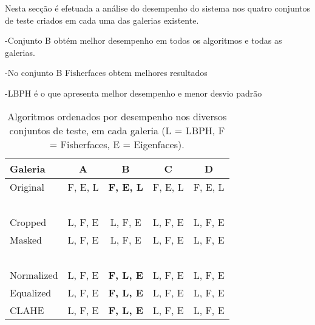Nesta secção é efetuada a análise do desempenho do sistema nos quatro conjuntos de teste criados em cada uma das galerias existente.

-Conjunto B obtém melhor desempenho em todos os algoritmos e todas as galerias.

-No conjunto B Fisherfaces obtem melhores resultados

-LBPH é o que apresenta melhor desempenho e menor desvio padrão

\begin{center}
\begin{table}
    \begin{center}
    \caption{Algoritmos ordenados por desempenho nos diversos conjuntos de teste, em cada galeria (L = LBPH, F = Fisherfaces, E = Eigenfaces).}
    \begin{tabular}{l|cccc}
    Galeria    & A & B & C & D \\ 
    \hline\hline
    Original   & F, E, L          &\textbf{ F, E, L }         & F, E, L           & F, E, L    \\
    ~ \\
    Cropped    & L, F, E          & L, F, E          & L, F, E           & L, F, E    \\
    Masked     & L, F, E          & L, F, E          & L, F, E           & L, F, E    \\
    ~ \\
    Normalized & L, F, E          &\textbf{ F, L, E}          & L, F, E           & L, F, E    \\
    Equalized  & L, F, E          &\textbf{ F, L, E}          & L, F, E           & L, F, E    \\
    CLAHE      & L, F, E          &\textbf{ F, L, E}          & L, F, E           & L, F, E    \\
    \hline\hline
    \end{tabular}
    \label{tab:ordem_algoritmos}
    \end{center}
\end{table}
\end{center}

